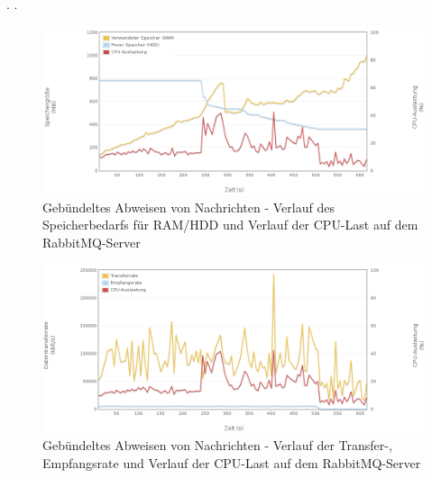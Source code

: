 \documentclass[	a4paper,
			11pt,
			titlepage,
			oneside,
			fleqn,
			listof=totoc,
			parskip,
			numbers=noenddot]{scrartcl}
\begin{document}
	
	\clearpage
		{%
		  \newline
		  \newline
		  \newline
		}{%
		.
		}{
		.
		}
		
		\begin{figure}[!htb]
			\centering
			\includegraphics[width=\textwidth]{img/nack/nack_server1.png}
			\caption{Gebündeltes Abweisen von Nachrichten - Verlauf des Speicherbedarfs für RAM/HDD und Verlauf der CPU-Last auf dem RabbitMQ-Server}
			\label{fig:nack-server1}
		\end{figure}
		
		\begin{figure}[!htb]
			\centering
			\includegraphics[width=\textwidth]{img/nack/nack_server2.png}
			\caption{Gebündeltes Abweisen von Nachrichten - Verlauf der Transfer-, Empfangsrate und Verlauf der CPU-Last auf dem RabbitMQ-Server}
			\label{fig:nack-server2}
		\end{figure}
		
\end{document}
